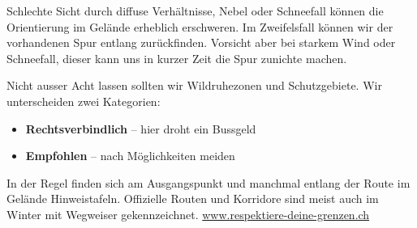 \newcolumn

Schlechte Sicht durch diffuse Verhältnisse, Nebel oder Schneefall können die Orientierung im Gelände erheblich erschweren.
Im Zweifelsfall können wir der vorhandenen Spur entlang zurückfinden.
Vorsicht aber bei starkem Wind oder Schneefall, dieser kann uns in kurzer Zeit die Spur zunichte machen.

Nicht ausser Acht lassen sollten wir Wildruhezonen und Schutzgebiete.
Wir unterscheiden zwei Kategorien:

\begin{itemize}
  \item{\textbf{Rechtsverbindlich} -- hier droht ein Bussgeld}
  \item{\textbf{Empfohlen} -- nach Möglichkeiten meiden}
\end{itemize}

In der Regel finden sich am Ausgangspunkt und manchmal entlang der Route im Gelände Hinweistafeln.
Offizielle  Routen und Korridore sind meist auch im Winter mit Wegweiser gekennzeichnet.
\href{https://www.respektiere-deine-grenzen.ch/}{www.respektiere-deine-grenzen.ch}
